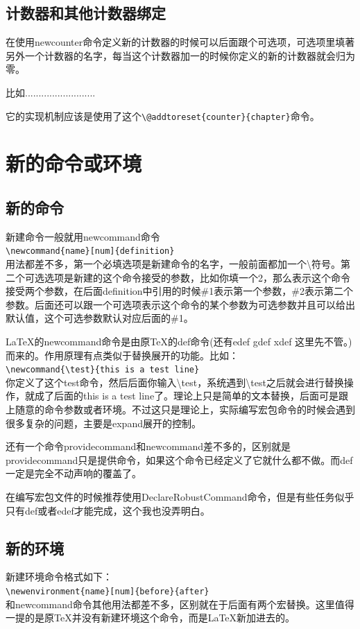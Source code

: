 \documentclass[11pt,oneside]{book}
\begin{document}
\begin{common-format}
\subsection{计数器和其他计数器绑定}
在使用newcounter命令定义新的计数器的时候可以后面跟个可选项，可选项里填著另外一个计数器的名字，每当这个计数器加一的时候你定义的新的计数器就会归为零。

比如..........................

它的实现机制应该是使用了这个{\footnotesize \verb+\@addtoreset{counter}{chapter}+}命令。


\section{新的命令或环境}

\subsection{新的命令}
新建命令一般就用newcommand命令\\
\verb+\newcommand{name}[num]{definition}+\\
用法都差不多，第一个必填选项是新建命令的名字，一般前面都加一个\textbackslash 符号。第二个可选选项是新建的这个命令接受的参数，比如你填一个2，那么表示这个命令接受两个参数，在后面definition中引用的时候\#{}1表示第一个参数，\#{}2表示第二个参数。后面还可以跟一个可选项表示这个命令的某个参数为可选参数并且可以给出默认值，这个可选参数默认对应后面的\#{}1。

\LaTeX 的newcommand命令是由原\TeX 的def命令(还有edef gdef xdef 这里先不管。)而来的。作用原理有点类似于替换展开的功能。比如：\\
\verb+\newcommand{\test}{this is a test line}+\\
你定义了这个test命令，然后后面你输入\textbackslash test，系统遇到\textbackslash test之后就会进行替换操作，就成了后面的this is a test line了。理论上只是简单的文本替换，后面可是跟上随意的命令参数或者环境。不过这只是理论上，实际编写宏包命令的时候会遇到很多复杂的问题，主要是expand展开的控制。

还有一个命令providecommand和newcommand差不多的，区别就是providecommand只是提供命令，如果这个命令已经定义了它就什么都不做。而def一定是完全不动声响的覆盖了。

在编写宏包文件的时候推荐使用DeclareRobustCommand命令，但是有些任务似乎只有def或者edef才能完成，这个我也没弄明白。

\subsection{新的环境}
\label{sec:新的环境}
新建环境命令格式如下：\\
\verb+\newenvironment{name}[num]{before}{after}+\\
和newcommand命令其他用法都差不多，区别就在于后面有两个宏替换。这里值得一提的是原\TeX 并没有新建环境这个命令，而是\LaTeX 新加进去的。


\end{common-format}
\end{document}
